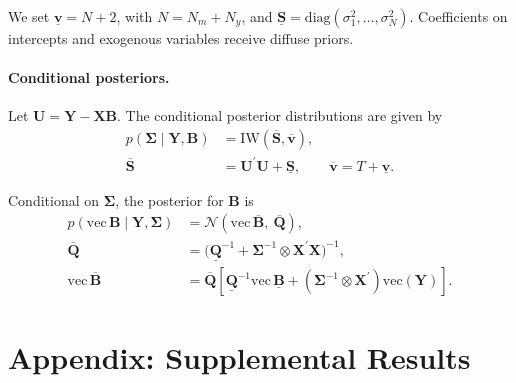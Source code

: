 \documentclass[12pt, reqno]{article}
\begin{document}
We set $\underline{\boldsymbol{v}} = N + 2$, with $N = N_m + N_y$, and $\underline{\boldsymbol{S}} = \mathrm{diag}(\sigma_1^2,\ldots,\sigma_N^2)$. Coefficients on intercepts and exogenous variables receive diffuse priors.

\paragraph{Conditional posteriors.}
Let $\boldsymbol{U} = \boldsymbol{Y} - \boldsymbol{X}\boldsymbol{B}$. The conditional posterior distributions are given by
\begin{align}
p(\boldsymbol{\Sigma}\mid \boldsymbol{Y}, \boldsymbol{B})
&= \mathrm{IW}(\overline{\boldsymbol{S}}, \overline{\boldsymbol{v}}),\\
\overline{\boldsymbol{S}}
&= \boldsymbol{U}^\prime \boldsymbol{U} + \underline{\boldsymbol{S}},\qquad
\overline{\boldsymbol{v}} = T + \underline{\boldsymbol{v}}.
\end{align}

Conditional on $\boldsymbol{\Sigma}$, the posterior for $\boldsymbol{B}$ is
\begin{align}
p\!\left(\mathrm{vec}\,\boldsymbol{B}\mid \boldsymbol{Y}, \boldsymbol{\Sigma}\right)
&= \mathcal{N}\!\left(\mathrm{vec}\,\overline{\boldsymbol{B}},\ \overline{\boldsymbol{Q}}\right),\\
\overline{\boldsymbol{Q}}
&=\Big(\underline{\boldsymbol{Q}}^{-1}+\boldsymbol{\Sigma}^{-1}\otimes \boldsymbol{X}^\prime\boldsymbol{X}\Big)^{-1},\\
\mathrm{vec}\,\overline{\boldsymbol{B}}
&=\overline{\boldsymbol{Q}}\left[\underline{\boldsymbol{Q}}^{-1}\mathrm{vec}\,\underline{\boldsymbol{B}}
+\left(\boldsymbol{\Sigma}^{-1}\otimes \boldsymbol{X}^\prime\right)\mathrm{vec}(\boldsymbol{Y})\right].
\end{align}


\newpage
\section{Appendix: Supplemental Results}
\hypertarget{Appendix B}{}
\end{document}
